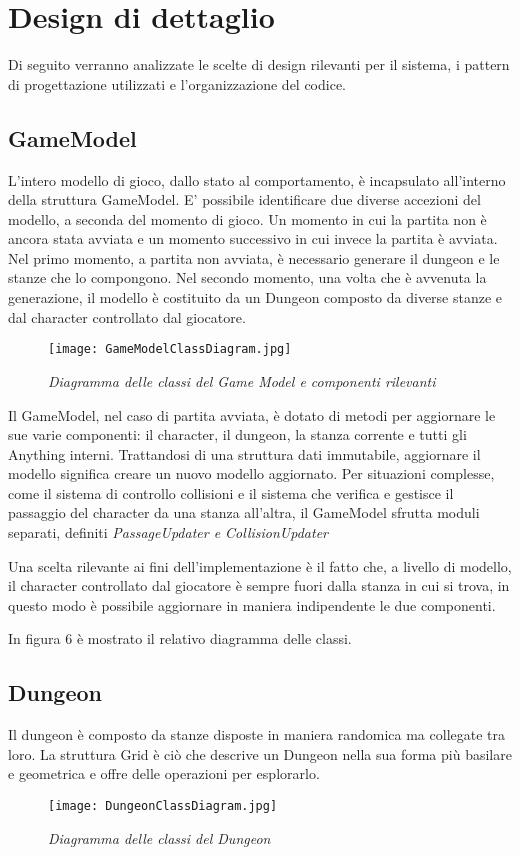 \section{Design di dettaglio}
Di seguito verranno analizzate le scelte di design rilevanti per il sistema, i pattern di progettazione utilizzati e l'organizzazione del codice. 
\subsection{GameModel}
L'intero modello di gioco, dallo stato al comportamento, è incapsulato all'interno della struttura GameModel. E' possibile identificare due diverse accezioni del modello, a seconda del momento di gioco. 
Un momento in cui la partita non è ancora stata avviata e un momento successivo in cui invece la partita è avviata.
Nel primo momento, a partita non avviata, è necessario generare il dungeon e le stanze che lo compongono. 
Nel secondo momento, una volta che è avvenuta la generazione, il modello è costituito da un Dungeon composto da diverse stanze e dal character controllato dal giocatore. 

\begin{figure}[!hbt]
    \centering
    \texttt{[image: GameModelClassDiagram.jpg]}
    \caption{\textit{Diagramma delle classi del Game Model e componenti rilevanti}} 
\end{figure}
Il GameModel, nel caso di partita avviata, è dotato di metodi per aggiornare le sue varie componenti: il character, il dungeon, la stanza corrente e tutti gli Anything interni. 
Trattandosi di una struttura dati immutabile, aggiornare il modello significa creare un nuovo modello aggiornato. Per situazioni complesse, come il sistema di controllo collisioni e il sistema che verifica e gestisce il passaggio del character da una stanza all'altra, il GameModel sfrutta moduli separati, definiti \textit{PassageUpdater e CollisionUpdater}

Una scelta rilevante ai fini dell'implementazione è il fatto che, a livello di modello, il character controllato dal giocatore è sempre fuori dalla stanza in cui si trova, in questo modo è possibile aggiornare in maniera indipendente le due componenti.

In figura 6 è mostrato il relativo diagramma delle classi.
\subsection{Dungeon}
Il dungeon è composto da stanze disposte in maniera randomica ma collegate tra loro. 
La struttura Grid è ciò che descrive un Dungeon nella sua forma più basilare e geometrica e offre delle operazioni per esplorarlo. 
\begin{figure}[!hbt]
    \centering
    \texttt{[image: DungeonClassDiagram.jpg]}
    \caption{\textit{Diagramma delle classi del Dungeon}} 
\end{figure}

